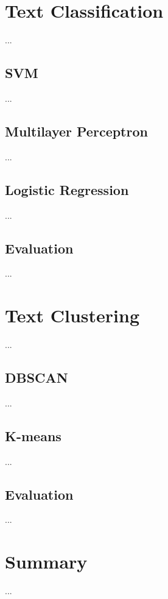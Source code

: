 \documentclass[fleqn,10pt]{SelfArx} %
\begin{document}
\section{Text Classification}
...

\subsection{SVM}
...

\subsection{Multilayer Perceptron}
...

\subsection{Logistic Regression}
...

\subsection{Evaluation}
...

\section{Text Clustering}
...

\subsection{DBSCAN}
...

\subsection{K-means}
...

\subsection{Evaluation}
...

\section{Summary}
...


\nocite{*}
\printbibliography
\end{document}

